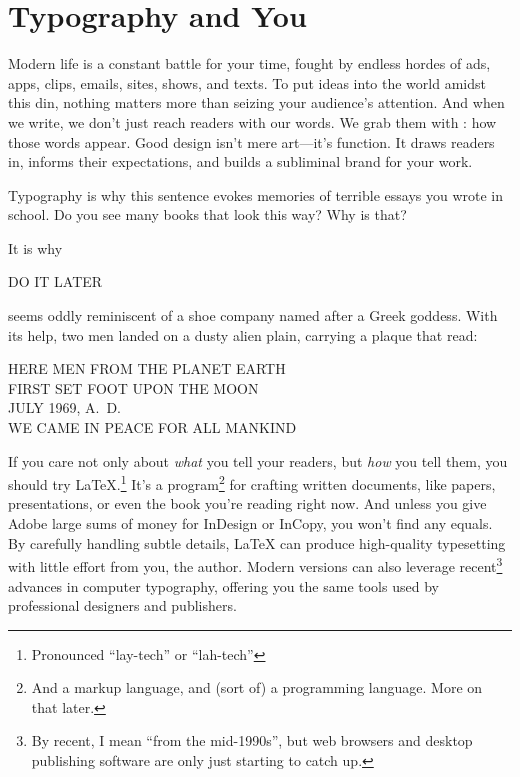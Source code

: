 \chapter{Typography and You}
\label{typography}

Modern life is a constant battle for your time,
fought by endless hordes of ads, apps, clips, emails, sites, shows, and texts.
To put ideas into the world amidst this din,
nothing matters more than seizing
your audience's attention.
And when we write, we don't just reach readers with our words.
We grab them with : how those words appear.
Good design isn't mere art---it's function.
It draws readers in,
informs their expectations, and builds a subliminal brand for your
work.\punckern{}
\begin{leftfigure}
\fontsize{12bp}{24bp}\selectfont\raggedright
Typography is why this sentence evokes memories of terrible essays
you wrote in school.
Do you see many books that look this way? Why is that?
\end{leftfigure}
\medskip

\noindent It is why
\begin{leftfigure}
\Large DO IT LATER
\end{leftfigure}
seems oddly reminiscent of a shoe company named after a Greek goddess.
With its help,\punckern{}
two men landed on a dusty alien plain, carrying a plaque that read:
\begin{center}
HERE MEN FROM THE PLANET EARTH \\
FIRST SET FOOT UPON THE MOON \\
JULY 1969, A.~D. \\
WE CAME IN PEACE FOR ALL MANKIND
\end{center}

If you care not only about \emph{what} you tell your readers, but \emph{how}
you tell them, you should try \LaTeX.\punckern\footnote{Pronounced ``lay-tech''
or ``lah-tech''}
It's a program\footnote{And a markup language,
and (sort of) a programming language.
More on that later.}
for crafting written documents, like papers, presentations,
or even the book you're reading right now.
And unless you give Adobe large sums
of money for InDesign or InCopy,
you won't find any equals.
By carefully handling subtle details,
\LaTeX{} can produce high-quality typesetting
with little effort from you, the author.
Modern versions can also leverage recent\footnote{By recent,
I mean ``from the mid-1990s''\quotekern, but web browsers and desktop publishing
software are only just starting to catch up.} advances in computer typography,
offering you the same tools used by professional designers and publishers.

